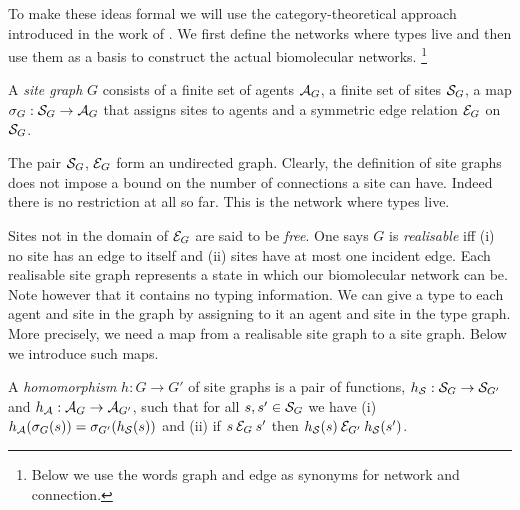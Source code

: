 To make these ideas formal we will use
the category-theoretical approach %
introduced in the work of \citet{kappadpo}.
We first define the networks where types live and then
use them as a basis to construct the actual biomolecular networks.%
\footnote{Below we use the words graph and edge
  as synonyms for network and connection.}

\begin{definition}%
  A \emph{site graph} $G$ consists of
  a finite set of agents $\mathcal{A}_G$,
  a finite set of sites $\mathcal{S}_G$,
  a map $\sigma_G: \mathcal{S}_G \to \mathcal{A}_G$
  that assigns sites to agents
  and a symmetric edge relation $\mathcal{E}_G$ on $\mathcal{S}_G$.
\end{definition}

The pair $\mathcal{S}_G$, $\mathcal{E}_G$ form an undirected graph.
Clearly, the definition of site graphs does not impose
a bound on the number of connections a site can have.
Indeed there is no restriction at all so far.
This is the network where types live.

Sites not in the domain of $\mathcal{E}_G$ are said to be \emph{free}.
One says $G$ is \emph{realisable} iff
(i) no site has an edge to itself and
(ii) sites have at most one incident edge.
Each realisable site graph represents a state
in which our biomolecular network can be.
Note however that it contains no typing information.
We can give a type to each agent and site in the graph
by assigning to it an agent and site in the type graph.
More precisely,
we need a map from a realisable site graph to a site graph.
Below we introduce such maps.

\begin{flushleft}
\begin{minipage}{.66\linewidth}
\begin{definition}
  A \emph{homomorphism} $h: G \to G'$ of site graphs is
  a pair of functions, $h_{\mathcal{S}}: \mathcal{S}_G \to \mathcal{S}_{G'}$
  and $h_{\mathcal{A}}: \mathcal{A}_G \to \mathcal{A}_{G'}$, such that
  for all $s,s' \in \mathcal{S}_G$ we have
  (i) $h_{\mathcal{A}}(\sigma_G(s)) = \sigma_{G'}(h_{\mathcal{S}}(s))$
  and (ii) if $s \mathbin{\mathcal{E}_G} s'$ then
  $h_{\mathcal{S}}(s) \mathbin{\mathcal{E}_{G'}} h_{\mathcal{S}}(s')$.
\end{definition}
\end{minipage}
\begin{minipage}{.3\linewidth}
\begin{flushright}
\end{flushright}
\end{minipage}
\end{flushleft}

